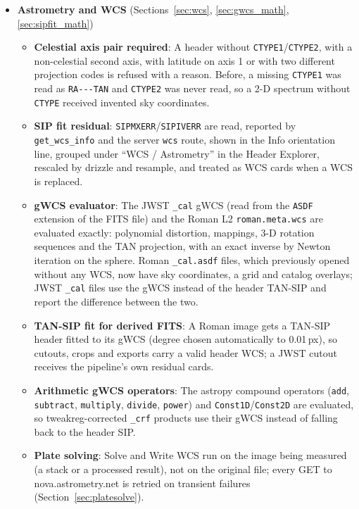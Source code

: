 \documentclass[11pt,a4paper]{article}
\newcommand{\code}[1]{\texttt{\small #1}}
\begin{document}
    \begin{itemize}[nosep]
    \item \textbf{Astrometry and WCS} (Sections~\ref{sec:wcs}, \ref{sec:gwcs_math}, \ref{sec:sipfit_math})
        \begin{itemize}[nosep]
        \item \textbf{Celestial axis pair required}: A header without \code{CTYPE1}/\code{CTYPE2}, with a non-celestial second axis, with latitude on axis 1 or with two different projection codes is refused with a reason. Before, a missing \code{CTYPE1} was read as \code{RA-{}-{}-TAN} and \code{CTYPE2} was never read, so a 2-D spectrum without \code{CTYPE} received invented sky coordinates.
        \item \textbf{SIP fit residual}: \code{SIPMXERR}/\code{SIPIVERR} are read, reported by \code{get\_wcs\_info} and the server \code{wcs} route, shown in the Info orientation line, grouped under ``WCS / Astrometry'' in the Header Explorer, rescaled by drizzle and resample, and treated as WCS cards when a WCS is replaced.
        \item \textbf{gWCS evaluator}: The JWST \code{\_cal} gWCS (read from the \code{ASDF} extension of the FITS file) and the Roman L2 \code{roman.meta.wcs} are evaluated exactly: polynomial distortion, mappings, 3-D rotation sequences and the TAN projection, with an exact inverse by Newton iteration on the sphere. Roman \code{\_cal.asdf} files, which previously opened without any WCS, now have sky coordinates, a grid and catalog overlays; JWST \code{\_cal} files use the gWCS instead of the header TAN-SIP and report the difference between the two.
        \item \textbf{TAN-SIP fit for derived FITS}: A Roman image gets a TAN-SIP header fitted to its gWCS (degree chosen automatically to 0.01\,px), so cutouts, crops and exports carry a valid header WCS; a JWST cutout receives the pipeline's own residual cards.
        \item \textbf{Arithmetic gWCS operators}: The astropy compound operators (\code{add}, \code{subtract}, \code{multiply}, \code{divide}, \code{power}) and \code{Const1D}/\code{Const2D} are evaluated, so tweakreg-corrected \code{\_crf} products use their gWCS instead of falling back to the header SIP.
        \item \textbf{Plate solving}: Solve and Write WCS run on the image being measured (a stack or a processed result), not on the original file; every GET to nova.astrometry.net is retried on transient failures (Section~\ref{sec:platesolve}).

\end{itemize}
\end{itemize}
\end{document}
